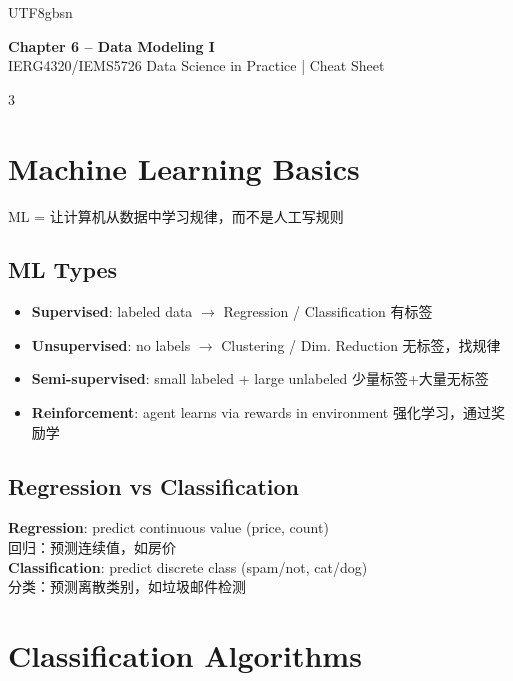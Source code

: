 \documentclass[9pt,landscape,a4paper]{article}
\newcommand{\zhint}[1]{{\scriptsize\color{gray!70!black}#1}}
\begin{document}
\begin{CJK}{UTF8}{gbsn}

\begin{center}
{\large\bfseries\color{blue!70!black} Chapter 6 -- Data Modeling I}\\
{\footnotesize IERG4320/IEMS5726 Data Science in Practice | Cheat Sheet}
\end{center}

\begin{multicols}{3}

\section{Machine Learning Basics}
\zhint{ML = 让计算机从数据中学习规律，而不是人工写规则}

\subsection{ML Types}
\begin{itemize}[leftmargin=8pt,itemsep=0pt,topsep=0pt]
\item \textbf{Supervised}: labeled data $\to$ Regression / Classification \zhint{有标签}
\item \textbf{Unsupervised}: no labels $\to$ Clustering / Dim. Reduction \zhint{无标签，找规律}
\item \textbf{Semi-supervised}: small labeled + large unlabeled \zhint{少量标签+大量无标签}
\item \textbf{Reinforcement}: agent learns via rewards in environment \zhint{强化学习，通过奖励学}
\end{itemize}

\subsection{Regression vs Classification}
\textbf{Regression}: predict continuous value (price, count)\\
\zhint{回归：预测连续值，如房价}\\
\textbf{Classification}: predict discrete class (spam/not, cat/dog)\\
\zhint{分类：预测离散类别，如垃圾邮件检测}

\section{Classification Algorithms}


\end{multicols}
\end{CJK}
\end{document}
